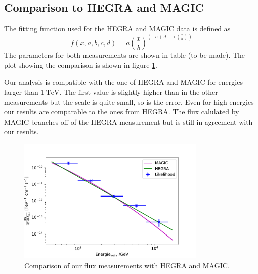 \subsection{Comparison to HEGRA and MAGIC}

The fitting function used for the HEGRA and MAGIC data is defined as
\begin{equation}
  f(x, a, b, c, d) = a \left(\frac{x}{b}\right)^{\left(-c + d\cdot \ln\left(\frac{x}{b}\right)\right)}
\end{equation}
The parameters for both measurements are shown in table (to be made). The plot showing the comparison is shown in figure \ref{fig:fluxComp}.

Our analysis is compatible with the one of HEGRA and MAGIC for energies larger than $\SI{1}{\tera\electronvolt}$. The first value is slightly higher than in the other measurements but the scale is quite small, so is the error. Even for high energies our results are comparable to the ones from HEGRA. The flux calulated by MAGIC branches off of the HEGRA measurement but is still in agreement with our results.

\begin{figure}[H]
  \centering
  \includegraphics[width=0.8\textwidth]{plots/Fluss_like.pdf}
  \caption{Comparison of our flux measurements with HEGRA and MAGIC.}
  \label{fig:fluxComp}
\end{figure}
